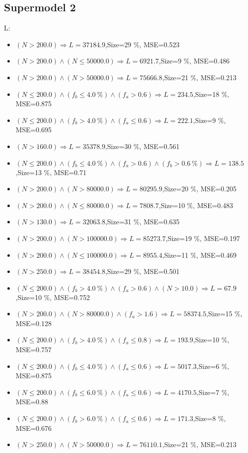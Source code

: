 \documentclass[numbered]{CSL}
\begin{document}
\subsection{Supermodel 2}
L:
\begin{itemize}
\item $(N > 200.0) \Rightarrow L = 37184.9$,\hfill Size=29 \%, MSE=0.523
\item $(N > 200.0) \land (N \leq 50000.0) \Rightarrow L = 6921.7$,\hfill Size=9 \%, MSE=0.486
\item $(N > 200.0) \land (N > 50000.0) \Rightarrow L = 75666.8$,\hfill Size=21 \%, MSE=0.213
\item $(N \leq 200.0) \land (f_b \leq 4.0~\%) \land (f_a > 0.6) \Rightarrow L = 234.5$,\hfill Size=18 \%, MSE=0.875
\item $(N \leq 200.0) \land (f_b > 4.0~\%) \land (f_a \leq 0.6) \Rightarrow L = 222.1$,\hfill Size=9 \%, MSE=0.695
\item $(N > 160.0) \Rightarrow L = 35378.9$,\hfill Size=30 \%, MSE=0.561
\item $(N \leq 200.0) \land (f_b \leq 4.0~\%) \land (f_a > 0.6) \land (f_b > 0.6~\%) \Rightarrow L = 138.5$,\hfill Size=13 \%, MSE=0.71
\item $(N > 200.0) \land (N > 80000.0) \Rightarrow L = 80295.9$,\hfill Size=20 \%, MSE=0.205
\item $(N > 200.0) \land (N \leq 80000.0) \Rightarrow L = 7808.7$,\hfill Size=10 \%, MSE=0.483
\item $(N > 130.0) \Rightarrow L = 32063.8$,\hfill Size=31 \%, MSE=0.635
\item $(N > 200.0) \land (N > 100000.0) \Rightarrow L = 85273.7$,\hfill Size=19 \%, MSE=0.197
\item $(N > 200.0) \land (N \leq 100000.0) \Rightarrow L = 8955.4$,\hfill Size=11 \%, MSE=0.469
\item $(N > 250.0) \Rightarrow L = 38454.8$,\hfill Size=29 \%, MSE=0.501
\item $(N \leq 200.0) \land (f_b > 4.0~\%) \land (f_a > 0.6) \land (N > 10.0) \Rightarrow L = 67.9$,\hfill Size=10 \%, MSE=0.752
\item $(N > 200.0) \land (N > 80000.0) \land (f_a > 1.6) \Rightarrow L = 58374.5$,\hfill Size=15 \%, MSE=0.128
\item $(N \leq 200.0) \land (f_b > 4.0~\%) \land (f_a \leq 0.8) \Rightarrow L = 193.9$,\hfill Size=10 \%, MSE=0.757
\item $(N \leq 200.0) \land (f_b \leq 4.0~\%) \land (f_a \leq 0.6) \Rightarrow L = 5017.3$,\hfill Size=6 \%, MSE=0.875
\item $(N \leq 200.0) \land (f_b \leq 6.0~\%) \land (f_a \leq 0.6) \Rightarrow L = 4170.5$,\hfill Size=7 \%, MSE=0.88
\item $(N \leq 200.0) \land (f_b > 6.0~\%) \land (f_a \leq 0.6) \Rightarrow L = 171.3$,\hfill Size=8 \%, MSE=0.676
\item $(N > 250.0) \land (N > 50000.0) \Rightarrow L = 76110.1$,\hfill Size=21 \%, MSE=0.213
\end{itemize}
\end{document}
